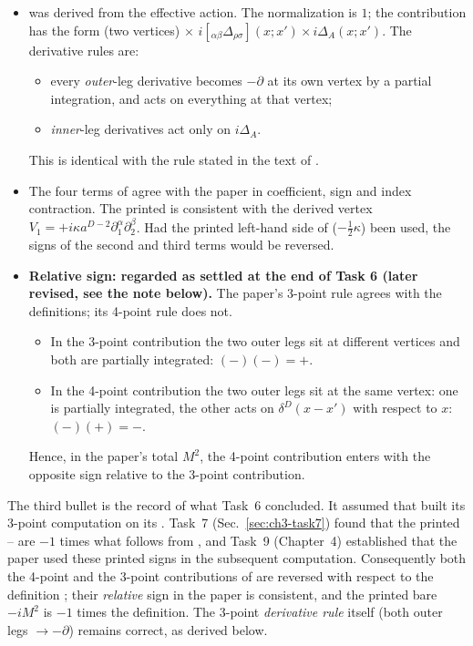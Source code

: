 \begin{resultbox}
\begin{itemize}[leftmargin=12pt]
\item {} was derived from the effective action. The normalization is $1$; the contribution has the form
(two vertices)$\,\times\,i[{}_{\alpha\beta}\Delta_{\rho\sigma}](x;x')\times i\Delta_A(x;x')$. The derivative rules are:
\begin{itemize}
\item every \emph{outer}-leg derivative becomes $-\partial$ at its own vertex by a partial integration, and acts on everything at that vertex;
\item \emph{inner}-leg derivatives act only on $i\Delta_A$.
\end{itemize}
This is identical with the rule stated in the text of \PI.
\item The four terms of  agree with the paper in coefficient, sign and index contraction. The printed  is consistent with
the derived vertex $V_1=+i\kappa a^{D-2}\partial_1^\alpha\partial_2^\beta$. Had the printed left-hand side of  ($-\tfrac12\kappa$) been used,
the signs of the second and third terms would be reversed.
\item \textbf{Relative sign: regarded as settled at the end of Task 6 (later revised, see the note below).} The paper's 3-point rule agrees with the definitions; its 4-point rule  does not.
\begin{itemize}
\item In the 3-point contribution the two outer legs sit at different vertices and both are partially integrated: $(-)(-)=+$.
\item In the 4-point contribution the two outer legs sit at the same vertex: one is partially integrated, the other acts on
$\delta^D(x-x')$ with respect to $x$: $(-)(+)=-$.
\end{itemize}
Hence, in the paper's total $M^2$, the 4-point contribution  enters with the opposite sign relative to the 3-point contribution.
\end{itemize}
\end{resultbox}

\begin{notebox}
The third bullet is the record of what Task~6 concluded. It assumed that \PI{} built its 3-point computation on its .
Task~7 (Sec.~\ref{sec:ch3-task7}) found that the printed -- are $-1$ times what follows from , and Task~9
(Chapter~4) established that the paper used these printed signs in the subsequent computation. Consequently both the 4-point and the
3-point contributions of \PI{} are reversed with respect to the definition ; their \emph{relative} sign in the paper is
consistent, and the printed bare $-iM^2$ is $-1$ times the definition. The 3-point \emph{derivative rule} itself (both outer legs
$\to-\partial$) remains correct, as derived below.
\end{notebox}

